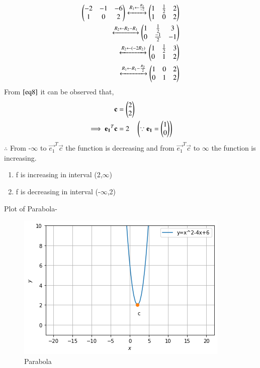 \documentclass[journal,12pt,twocolumn]{IEEEtran}
\begin{document}
\begin{align}
\begin{pmatrix}-2 & -1 & -6\\1 & 0 & 2\end{pmatrix} 
\xleftrightarrow{R_1\leftarrow \frac{R_1}{-2}}\begin{pmatrix}1 & \frac{1}{2} & 2\\1 & 0 & 2\end{pmatrix} 
\\
\xleftrightarrow{R_2\leftarrow R_2 -R_1}\begin{pmatrix}1 & \frac{1}{2} & 3 \\0 & \frac{-1}{2} & -1\end{pmatrix}
\\
\xleftrightarrow{R_2\leftarrow (-2R_2)}\begin{pmatrix}1 & \frac{1}{2} & 3 \\0 & 1 & 2\end{pmatrix}
\\
\xleftrightarrow{R_1\leftarrow R_1 - \frac{R_2}{2}}\begin{pmatrix}1 & 0 & 2\\0 & 1 & 2\end{pmatrix}   \label{eq8}
\end{align}
From $\eqref{eq8}$ it can be observed that,
\begin{align}
\mathbf{c} &= \begin{pmatrix}2 \\ 2\end{pmatrix}
\\
\implies \mathbf{e_1}^T\mathbf{c}&=2  \quad\left(\because\mathbf{e_1}=\begin{pmatrix}1\\0\end{pmatrix}\right)
\end{align}
$\therefore$ From -$\infty$ to $\vec{e_1}^T\vec{c}$ the function is decreasing and from $\vec{e_1}^T\vec{c}$ to $\infty$ the function is increasing.
\begin{enumerate}
\item f is increasing in interval (2,$\infty$)
\item f is decreasing in interval (-$\infty$,2)
\end{enumerate}

Plot of Parabola-
\begin{figure}[ht]
    \centering
    \includegraphics[width=\columnwidth]{Figure.png}
    \caption{Parabola}
    \label{fig:Prarabola}
\end{figure}    
\end{document}
